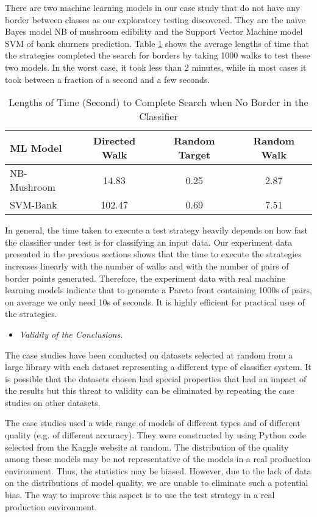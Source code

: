 \documentclass[preprint,1p,authoryear,times]{elsarticle}
\begin{document}
There are two machine learning models in our case study that do not have any border between classes as our exploratory testing discovered. They are the naïve Bayes model NB of mushroom edibility and the Support Vector Machine model SVM of bank churners prediction. Table \ref{tab:TimeOfNoBorder} shows the average lengths of time that the strategies completed the search for borders by taking 1000 walks to test these two models. In the worst case, it took less than 2 minutes, while in most cases it took between a fraction of a second and a few seconds. 

\begin{table}[h]
\centering
\caption{Lengths of Time (Second) to Complete Search when No Border in the Classifier}\label{tab:TimeOfNoBorder}
\scriptsize
\begin{tabular}{|l|c|c|c|}
\hline
ML Model	 &Directed Walk	&Random Target	&Random Walk\\
\hline
NB-Mushroom	&14.83	 &0.25	 &2.87\\
SVM-Bank	 &102.47 &	0.69 	&7.51\\
\hline
\end{tabular} 
\end{table}

In general, the time taken to execute a test strategy heavily depends on how fast the classifier under test is for classifying an input data. Our experiment data presented in the previous sections shows that the time to execute the strategies increases linearly with the number of walks and with the number of pairs of border points generated. Therefore, the experiment data with real machine learning models indicate that to generate a Pareto front containing 1000s of pairs, on average we only need 10s of seconds. It is highly efficient for practical uses of the strategies. 

\begin{itemize}
\item \emph{Validity of the Conclusions.}
\end{itemize}

The case studies have been conducted on datasets selected at random from a large library with each dataset representing a different type of classifier system. It is possible that the datasets chosen had special properties that had an impact of the results but this threat to validity can be eliminated by repeating the case studies on other datasets.

The case studies used a wide range of models of different types and of different quality (e.g. of different accuracy). They were constructed by using Python code selected from the Kaggle website at random. The distribution of the quality among these models may be not representative of the models in a real production environment. Thus, the statistics may be biased. However, due to the lack of data on the distributions of model quality, we are unable to eliminate such a potential bias. The way to improve this aspect is to use the test strategy in a real production environment. 
\end{document}
